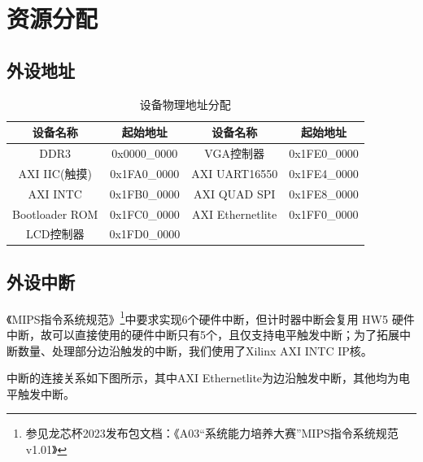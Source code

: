 \section{资源分配}

\subsection{外设地址}

\begin{table}[!ht]
\centering
\caption{设备物理地址分配}
\label{tab:pehi_addr}
\begin{tabular}{cc|cc}
\hline
设备名称           & 起始地址         & 设备名称                 & 起始地址                 \\ \hline
DDR3           & 0x0000\_0000 & VGA控制器               & 0x1FE0\_0000         \\
AXI IIC(触摸)    & 0x1FA0\_0000 & AXI UART16550        & 0x1FE4\_0000         \\
AXI INTC       & 0x1FB0\_0000 & AXI QUAD SPI     & 0x1FE8\_0000         \\
Bootloader ROM & 0x1FC0\_0000 & AXI Ethernetlite  &  0x1FF0\_0000                 \\
LCD控制器         & 0x1FD0\_0000 & \multicolumn{1}{l}{} & \multicolumn{1}{l}{} \\ \hline
\end{tabular}
\end{table}

\subsection{外设中断}

《MIPS指令系统规范》\footnote{参见龙芯杯2023发布包文档：《A03“系统能力培养大赛”MIPS指令系统规范v1.01》}中要求实现6个硬件中断，但计时器中断会复用 HW5 硬件中断，故可以直接使用的硬件中断只有5个，且仅支持电平触发中断；为了拓展中断数量、处理部分边沿触发的中断，我们使用了Xilinx AXI INTC IP核。

中断的连接关系如下图所示，其中AXI Ethernetlite为边沿触发中断，其他均为电平触发中断。



